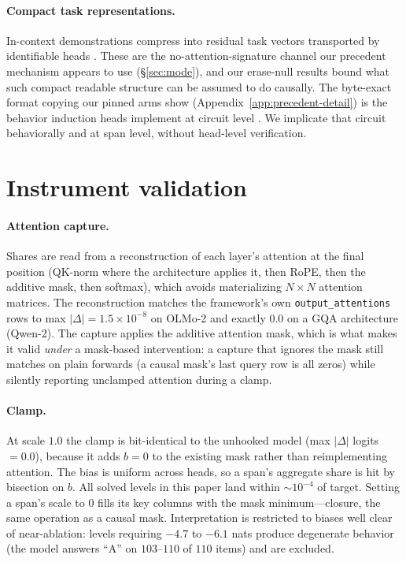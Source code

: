 \documentclass{article}
\begin{document}
\paragraph{Compact task representations.}
In-context demonstrations compress into residual task vectors \citep{hendel2023taskvectors}
transported by identifiable heads \citep{todd2024functionvectors}. These are the
no-attention-signature channel our precedent mechanism
appears to use (\S\ref{sec:mode}), and our erase-null results bound what such compact readable
structure can be assumed to do causally. The byte-exact format copying our pinned arms show
(Appendix~\ref{app:precedent-detail}) is the behavior induction heads implement at circuit
level \citep{olsson2022induction}. We implicate that circuit behaviorally and at span level,
without head-level verification.

\section{Instrument validation}
\label{app:instruments}

\paragraph{Attention capture.}
Shares are read from a reconstruction of each layer's attention at the final position
(QK-norm where the architecture applies it, then RoPE, then the additive mask, then softmax),
which avoids materializing $N\times N$ attention matrices. The reconstruction matches the
framework's own \texttt{output\_attentions} rows to max $|\Delta| = 1.5\times10^{-8}$ on OLMo-2
and exactly $0.0$ on a GQA architecture (Qwen-2). The capture applies the additive attention
mask, which is what makes it valid \emph{under} a mask-based intervention: a capture that
ignores the mask still matches on plain forwards (a causal mask's last query row is all zeros)
while silently reporting unclamped attention during a clamp.

\paragraph{Clamp.}
At scale $1.0$ the clamp is bit-identical to the unhooked model (max $|\Delta|$ logits $=0.0$),
because it adds $b{=}0$ to the existing mask rather than reimplementing attention. The bias is
uniform across heads, so a span's aggregate share is hit by bisection on $b$. All solved levels
in this paper land within ${\sim}10^{-4}$ of target. Setting a span's scale to $0$ fills its key
columns with the mask minimum---closure, the same operation as a causal mask. Interpretation is
restricted to biases well clear of near-ablation: levels requiring $-4.7$ to $-6.1$ nats produce
degenerate behavior (the model answers ``A'' on $103$--$110$ of $110$ items) and are excluded.
\end{document}
